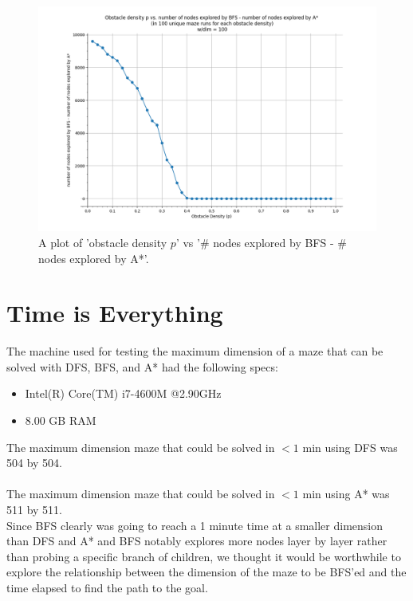 \documentclass[11pt]{article}
\begin{document}
\begin{figure}[h]
\centering
\includegraphics[scale=0.55]{graphs/obstacleDensity_vs_nodesBFSminusNodesAstar.PNG}
\caption{A plot of 'obstacle density $p$' vs '\# nodes explored by BFS - \# nodes explored by A*'.}
\label{BFS-A}
\end{figure}

	\pagebreak
\section{Time is Everything}
The machine used for testing the maximum dimension of a maze that can be solved with DFS, BFS, and A* had the following specs:
\begin{itemize}
\item Intel(R) Core(TM) i7-4600M @2.90GHz
\item 8.00 GB RAM
\end{itemize}
The maximum dimension maze that could be solved in $<1$ min using DFS was 504 by 504.\\\\
The maximum dimension maze that could be solved in $<1$ min using A* was 511 by 511.\\

Since BFS clearly was going to reach a 1 minute time at a smaller dimension than DFS and A* and BFS notably explores more nodes layer by layer rather than probing a specific branch of children, we thought it would be worthwhile to explore the relationship between the dimension of the maze to be BFS'ed and the time elapsed to find the path to the goal.\\
\end{document}
